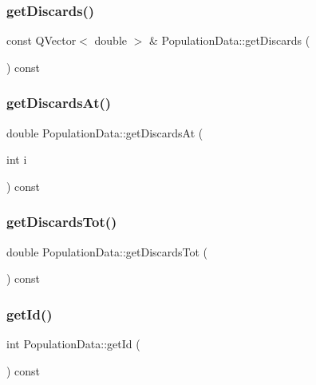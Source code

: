 \mbox{\label{class_population_data_a99700b0eb7d8724af631d923bccd8973}} 
\subsubsection{\texorpdfstring{getDiscards()}{getDiscards()}}
{\footnotesize\ttfamily const Q\+Vector$<$ double $>$ \& Population\+Data\+::get\+Discards (\begin{DoxyParamCaption}{ }\end{DoxyParamCaption}) const}

\mbox{\label{class_population_data_a2ac9a9412cd3115556d05d5b1d3f7a9a}} 
\subsubsection{\texorpdfstring{getDiscardsAt()}{getDiscardsAt()}}
{\footnotesize\ttfamily double Population\+Data\+::get\+Discards\+At (\begin{DoxyParamCaption}\item[{int}]{i }\end{DoxyParamCaption}) const}

\mbox{\label{class_population_data_a5c8ac4309d73dc95ccf736262165fa55}} 
\subsubsection{\texorpdfstring{getDiscardsTot()}{getDiscardsTot()}}
{\footnotesize\ttfamily double Population\+Data\+::get\+Discards\+Tot (\begin{DoxyParamCaption}{ }\end{DoxyParamCaption}) const}

\mbox{\label{class_population_data_ae90cbce9e2df739c6e1a5d1b7a9a6edb}} 
\subsubsection{\texorpdfstring{getId()}{getId()}}
{\footnotesize\ttfamily int Population\+Data\+::get\+Id (\begin{DoxyParamCaption}{ }\end{DoxyParamCaption}) const}

